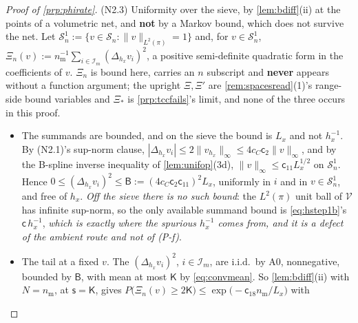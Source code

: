 \begin{proof}[Proof of \cref{prp:phirate}]
(N2.3) Uniformity over the sieve, by \cref{lem:bdiff}(ii) at the points of a volumetric net, and
\textbf{not} by a Markov bound, which does not survive the net. Let
$\mathcal S^1_n:=\{v\in\mathcal S_n:\|v\|_{L^{2}(\pi)}=1\}$ and, for $v\in\mathcal S^{1}_n$,
$\varXi_n(v):=n_{\mathrm m}^{-1}\sum_{i\in\mathcal I_m}(\Delta_{h_x}v_i)^{2}$, a positive semi-definite
quadratic form in the coefficients of $v$. $\varXi_n$ is bound here, carries
an $n$ subscript and \textbf{never} appears without a function argument; the upright $\Xi,\Xi'$ are
\cref{rem:spacesread}\textup{(1)}'s range-side bound variables and $\Xi_\ast$ is \cref{prp:tccfails}'s limit, and none of
the three occurs in this proof.
\begin{itemize}
\item[--] The summands are bounded, and on the sieve the bound is $L_x$ and not $h_x^{-1}$. By
(N2.1)'s sup-norm clause, $|\Delta_{h_x}v_i|\le2\|v_{h_x}\|_\infty\le4c_C\mathsf c_2\|v\|_\infty$, and by
the B-spline inverse inequality of \cref{lem:unifop}(3d),
$\|v\|_\infty\le\mathsf c_{11}L_x^{1/2}$ on $\mathcal S^{1}_n$. Hence
$0\le(\Delta_{h_x}v_i)^{2}\le\mathsf B:=(4c_C\mathsf c_2\mathsf c_{11})^{2}L_x$, uniformly in
$i$ and in $v\in\mathcal S^{1}_n$, and free of $h_x$. \emph{Off the sieve there is no such bound}: the
$L^{2}(\pi)$ unit ball of $\mathcal V$ has infinite sup-norm, so the only available summand bound is
\eqref{eq:hstep1b}'s $\mathsf c\,h_x^{-1}$, \emph{which is exactly where the spurious $h_x^{-1}$ comes
from, and it is a defect of the ambient route and not of (P-f)}.
\item[--] The tail at a fixed $v$. The $(\Delta_{h_x}v_i)^{2}$, $i\in\mathcal I_m$, are i.i.d.\ by
A0, nonnegative, bounded by $\mathsf B$, with mean at most $\mathsf K$ by \eqref{eq:convmean}. So
\cref{lem:bdiff}(ii) with $N=n_{\mathrm m}$, at $\mathsf s=\mathsf K$, gives
$P\big(\varXi_n(v)\ge2\mathsf K\big)\le\exp\big(-\mathsf c_{18}n_{\mathrm m}/L_x\big)$ with

\end{itemize}
\end{proof}
